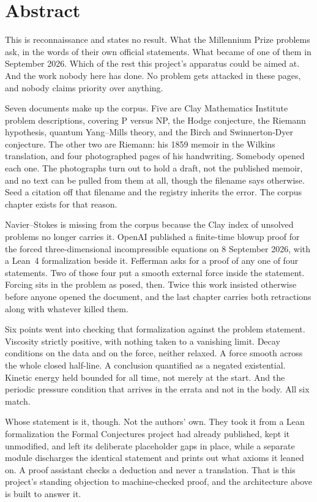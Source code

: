 \chapter*{Abstract}

This is reconnaissance and states no result. What the Millennium Prize problems ask, in the words of their own
official statements. What became of one of them in September 2026. Which of the rest this project's
apparatus could be aimed at. And the work nobody here has done. No problem gets attacked in these
pages, and nobody claims priority over anything.

Seven documents make up the corpus. Five are Clay Mathematics Institute problem descriptions,
covering P versus NP, the Hodge conjecture, the Riemann hypothesis, quantum Yang--Mills theory, and
the Birch and Swinnerton-Dyer conjecture. The other two are Riemann: his 1859 memoir in the Wilkins
translation, and four photographed pages of his handwriting. Somebody opened each one. The
photographs turn out to hold a draft, not the published memoir, and no text can be pulled from them
at all, though the filename says otherwise. Seed a citation off that filename and the registry
inherits the error. The corpus chapter exists for that reason.

Navier--Stokes is missing from the corpus because the Clay index of unsolved problems no longer
carries it. OpenAI published a finite-time blowup proof for the forced three-dimensional
incompressible equations on 8 September 2026, with a Lean~4 formalization beside it. Fefferman asks
for a proof of any one of four statements. Two of those four put a smooth external force inside the
statement. Forcing sits in the problem as posed, then. Twice this work insisted otherwise before
anyone opened the document, and the last chapter carries both retractions along with whatever
killed them.

Six points went into checking that formalization against the problem statement. Viscosity strictly
positive, with nothing taken to a vanishing limit. Decay conditions on the data and on the force,
neither relaxed. A force smooth across the whole closed half-line. A conclusion quantified as a
negated existential. Kinetic energy held bounded for all time, not merely at the start. And the
periodic pressure condition that arrives in the errata and not in the body. All six match.

Whose statement is it, though. Not the authors' own. They took it from a Lean formalization the
Formal Conjectures project had already published, kept it unmodified, and left its deliberate
placeholder gaps in place, while a separate module discharges the identical statement and prints out
what axioms it leaned on. A proof assistant checks a deduction and never a translation. That is this
project's standing objection to machine-checked proof, and the architecture above is built to answer
it.

